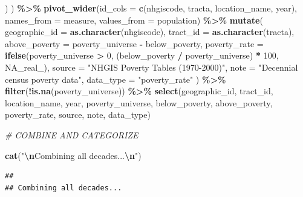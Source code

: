 \documentclass[
]{article}
\newenvironment{Shaded}{\begin{snugshade}}{\end{snugshade}}
\newcommand{\AttributeTok}[1]{\textcolor[rgb]{0.13,0.29,0.53}{#1}}
\newcommand{\CommentTok}[1]{\textcolor[rgb]{0.56,0.35,0.01}{\textit{#1}}}
\newcommand{\ConstantTok}[1]{\textcolor[rgb]{0.56,0.35,0.01}{#1}}
\newcommand{\DecValTok}[1]{\textcolor[rgb]{0.00,0.00,0.81}{#1}}
\newcommand{\FunctionTok}[1]{\textcolor[rgb]{0.13,0.29,0.53}{\textbf{#1}}}
\newcommand{\NormalTok}[1]{#1}
\newcommand{\SpecialCharTok}[1]{\textcolor[rgb]{0.81,0.36,0.00}{\textbf{#1}}}
\newcommand{\StringTok}[1]{\textcolor[rgb]{0.31,0.60,0.02}{#1}}
\begin{document}
\begin{Shaded}
\begin{Highlighting}[]
\NormalTok{    )}
\NormalTok{  ) }\SpecialCharTok{\%\textgreater{}\%}
  \FunctionTok{pivot\_wider}\NormalTok{(}\AttributeTok{id\_cols =} \FunctionTok{c}\NormalTok{(nhgiscode, tracta, location\_name, year), }
              \AttributeTok{names\_from =}\NormalTok{ measure, }\AttributeTok{values\_from =}\NormalTok{ population) }\SpecialCharTok{\%\textgreater{}\%}
  \FunctionTok{mutate}\NormalTok{(}
    \AttributeTok{geographic\_id =} \FunctionTok{as.character}\NormalTok{(nhgiscode),}
    \AttributeTok{tract\_id =} \FunctionTok{as.character}\NormalTok{(tracta),}
    \AttributeTok{above\_poverty =}\NormalTok{ poverty\_universe }\SpecialCharTok{{-}}\NormalTok{ below\_poverty,}
    \AttributeTok{poverty\_rate =} \FunctionTok{ifelse}\NormalTok{(poverty\_universe }\SpecialCharTok{\textgreater{}} \DecValTok{0}\NormalTok{, (below\_poverty }\SpecialCharTok{/}\NormalTok{ poverty\_universe) }\SpecialCharTok{*} \DecValTok{100}\NormalTok{, }\ConstantTok{NA\_real\_}\NormalTok{),}
    \AttributeTok{source =} \StringTok{"NHGIS Poverty Tables (1970{-}2000)"}\NormalTok{,}
    \AttributeTok{note =} \StringTok{"Decennial census poverty data"}\NormalTok{,}
    \AttributeTok{data\_type =} \StringTok{"poverty\_rate"}
\NormalTok{  ) }\SpecialCharTok{\%\textgreater{}\%}
  \FunctionTok{filter}\NormalTok{(}\SpecialCharTok{!}\FunctionTok{is.na}\NormalTok{(poverty\_universe)) }\SpecialCharTok{\%\textgreater{}\%}
  \FunctionTok{select}\NormalTok{(geographic\_id, tract\_id, location\_name, year, poverty\_universe, }
\NormalTok{         below\_poverty, above\_poverty, poverty\_rate, source, note, data\_type)}


\CommentTok{\# COMBINE AND CATEGORIZE}

\FunctionTok{cat}\NormalTok{(}\StringTok{"}\SpecialCharTok{\textbackslash{}n}\StringTok{Combining all decades...}\SpecialCharTok{\textbackslash{}n}\StringTok{"}\NormalTok{)}
\end{Highlighting}
\end{Shaded}

\begin{verbatim}
## 
## Combining all decades...
\end{verbatim}
\end{document}
